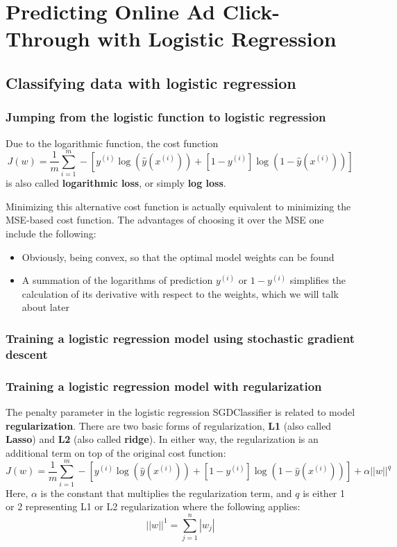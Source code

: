 \chapter{Predicting Online Ad Click-Through with Logistic Regression}
\section{Classifying data with logistic regression}
\subsection{Jumping from the logistic function to logistic regression}
Due to the logarithmic function, the cost function
\begin{equation}
    J(w)=\frac{1}{m}\sum_{i=1}^{m}-[y^{(i)}\log(\hat{y}(x^{(i)}))+[1-y^{(i)}]\log(1-\hat{y}(x^{(i)}))]
\end{equation}
is also called \textbf{logarithmic loss}, or simply \textbf{log loss}.

Minimizing this alternative cost function is actually equivalent to minimizing the MSE-based cost function. The advantages of choosing it over the MSE one include the following:
\begin{itemize}
    \item Obviously, being convex, so that the optimal model weights can be found
    \item A summation of the logarithms of prediction $y^{(i)}$ or $1-y^{(i)}$ simplifies the calculation of its derivative with respect to the weights, which we will talk about later
\end{itemize}
\subsection{Training a logistic regression model using stochastic gradient descent}
\subsection{Training a logistic regression model with regularization}
The penalty parameter in the logistic regression SGDClassifier is related to model \textbf{regularization}. There are two basic forms of regularization, \textbf{L1} (also called \textbf{Lasso}) and \textbf{L2} (also called \textbf{ridge}). In either way, the regularization is an additional term on top of the original cost function:
\begin{equation}
    J(w)=\frac{1}{m}\sum_{i=1}^{m}-[y^{(i)}\log(\hat{y}(x^{(i)}))+[1-y^{(i)}]\log(1-\hat{y}(x^{(i)}))]+\alpha||w||^{q}
\end{equation}
Here, $\alpha$ is the constant that multiplies the regularization term, and $q$ is either 1 or 2 representing L1 or L2 regularization where the following applies:
\begin{equation}
    ||w||^{1}=\sum_{j=1}^{n}|w_j|
\end{equation}

